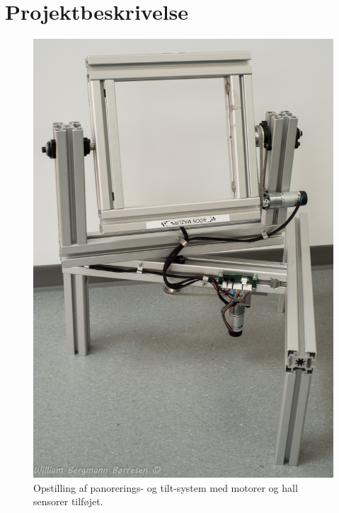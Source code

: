 \section{Projektbeskrivelse}
\begin{figure}
	\centering
		\includegraphics[scale=0.2]{Billeder/opstilling.jpg}
\caption{Opstilling af panorerings- og tilt-system med motorer og hall sensorer tilføjet.}
\label{fig:Opstilling}
\end{figure}
